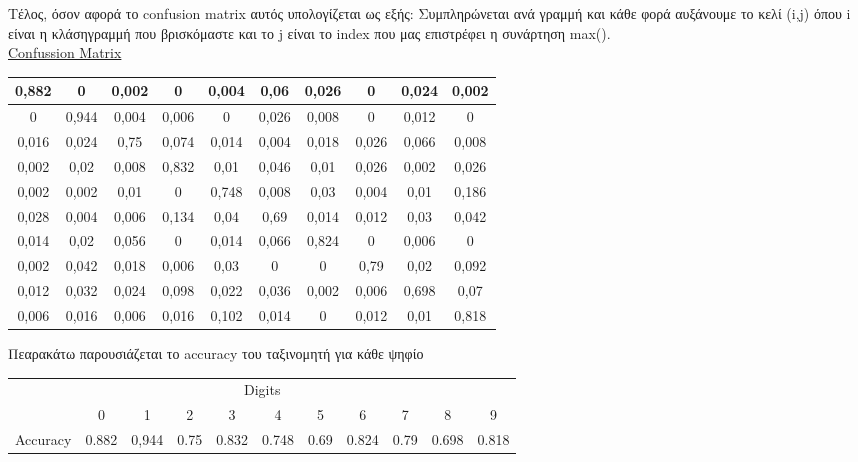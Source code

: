 \documentclass{article}
\begin{document}
	\noindent
	Tέλος, όσον αφορά το confusion matrix αυτός υπολογίζεται ως εξής: Συμπληρώνεται ανά γραμμή και κάθε φορά αυξάνουμε το κελί (i,j) όπου i είναι η κλάσηγραμμή που βρισκόμαστε και το j είναι το index που μας επιστρέφει η συνάρτηση max().\\
	
	\noindent
	\underline{Confussion Matrix}\\
	\begin{table}[h!]
		\centering 
		\begin{tabular}{|c|c|c|c|c|c|c|c|c|c|} 
			\hline
			0,882 & 0 & 0,002 & 0 & 0,004 & 0,06 & 0,026 & 0 & 0,024 & 0,002 \\ \hline
			0 & 0,944 & 0,004 & 0,006 & 0 &	0,026 & 0,008 & 0 & 0,012 & 0 \\ \hline
			0,016 &	0,024 & 0,75 & 0,074 & 0,014 & 0,004& 0,018 & 0,026 & 0,066 & 0,008 \\ \hline
			0,002 &	0,02 & 0,008 & 0,832 & 0,01 & 0,046 & 0,01 & 0,026 & 0,002 & 0,026  \\ \hline
			0,002 & 0,002 & 0,01 & 0 & 0,748 & 0,008 & 0,03 & 0,004 & 0,01 & 0,186 \\ \hline
			0,028 & 0,004 & 0,006 &	0,134 &	0,04 & 0,69 & 0,014 & 0,012 & 0,03 & 0,042\\ \hline
			0,014 &	0,02 & 0,056 & 0 & 0,014 & 0,066 & 0,824 & 0 & 0,006 & 0\\ \hline
			0,002 &	0,042 &	0,018 &	0,006 &	0,03 & 0 & 0 & 0,79 & 0,02 & 0,092\\ \hline
			0,012 &	0,032 &	0,024 & 0,098 &	0,022 & 0,036 & 0,002 & 0,006 & 0,698 & 0,07\\ \hline
			0,006 &	0,016 &	0,006 & 0,016 &	0,102 &	0,014 &	0 & 0,012 & 0,01 & 0,818\\ \hline
		\end{tabular}
	\end{table}

	\noindent
	Πεαρακάτω παρουσιάζεται το accuracy του ταξινομητή για κάθε ψηφίο
	
	\begin{table}[!ht]  
		\centering
		\begin{tabular}{|c|c|c|c|c|c|c|c|c|c|c|}
			\multicolumn{11}{c}{Digits}\\
			\cline{2-11}
			\multicolumn{1}{c|}{} &  0 &  1 &  2  &  3 &  4 &  5 &  6 &  7  &  8 &  9\\ \hline
			Accuracy & 0.882  & 0,944 & 0.75 & 0.832 & 0.748 & 0.69 & 0.824 & 0.79 & 0.698 & 0.818\\ \hline
		\end{tabular}
	\end{table}
\end{document}
